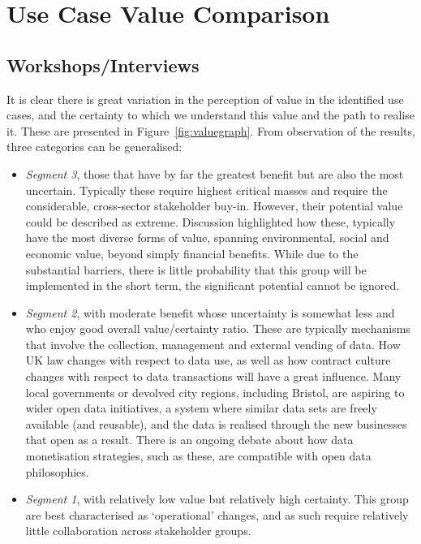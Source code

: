 \documentclass[journal]{IEEEtran}
\begin{document}
\section{Use Case Value Comparison}\label{usecasecomp}

\subsection{Workshops/Interviews}

It is clear there is great variation in the perception of value in the
identified use cases, and the certainty to which we understand this
value and the path to realise it. These are presented in
Figure~\ref{fig:valuegraph}. From observation of the results, three
categories can be generalised:

\begin{itemize}
\item {\emph{Segment 3}}, those that have by far the greatest benefit but are
  also the most uncertain. Typically these require highest critical
  masses and require the considerable, cross-sector stakeholder
  buy-in. However, their potential value could be described as
  extreme. Discussion highlighted how these, typically have the most
  diverse forms of value, spanning environmental, social and economic
  value, beyond simply financial benefits. While due to the
  substantial barriers, there is little probability that this group
  will be implemented in the short term, the significant potential
  cannot be ignored.
\item {\emph{Segment 2}}, with moderate benefit whose uncertainty is somewhat
  less and who enjoy good overall value/certainty ratio. These are
  typically mechanisms that involve the collection, management and
  external vending of data. How UK law changes with respect to data
  use, as well as how contract culture changes with respect to data
  transactions will have a great influence. Many local governments or
  devolved city regions, including Bristol, are aspiring to wider open
  data initiatives, a system where similar data sets are freely
  available (and reusable), and the data is realised through the new
  businesses that open as a result. There is an ongoing debate about
  how data monetisation strategies, such as these, are compatible with
  open data philosophies.
\item {\emph{Segment 1}}, with relatively low value but relatively high
  certainty. This group are best characterised as `operational'
  changes, and as such require relatively little collaboration across
  stakeholder groups. 
\end{itemize}
\end{document}
